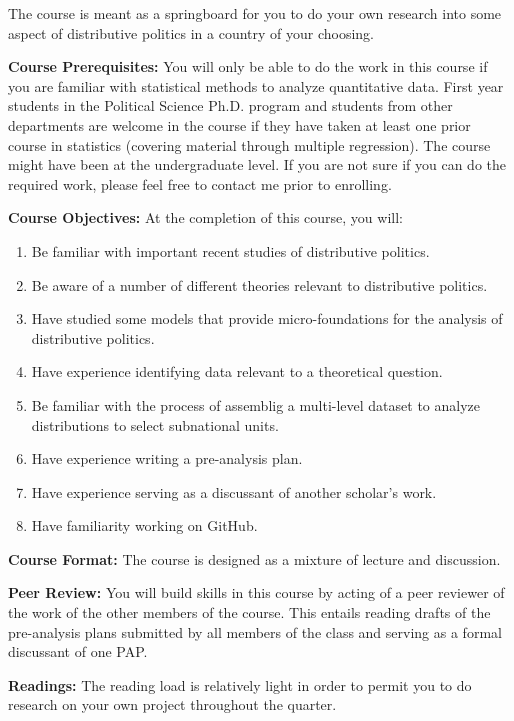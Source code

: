 \documentclass[11pt]{article}
\begin{document}
The course is meant as a springboard for you to do your own research into some aspect of distributive politics in a country
of your choosing. 


\textbf {\large Course Prerequisites:}  You will only be able to do the work in this course if you are familiar with 
statistical methods to analyze quantitative data. First year students in the Political Science Ph.D. 
program and students from other departments are welcome in the course if they have taken at least 
one prior course in statistics (covering material through multiple regression). The 
course might have been at the undergraduate level. If you are not sure if you can do the 
required work, please feel free to contact me prior to enrolling.


\textbf {\large Course Objectives:}  At the completion of this course, you will:
\begin{enumerate} [noitemsep]
  \item  Be familiar with important recent studies of distributive politics.
\item Be aware of a number of different theories relevant to distributive politics.
\item Have studied some models that provide micro-foundations for the analysis of distributive politics.
\item Have experience identifying data relevant to a theoretical question.
\item Be familiar with the process of assemblig a multi-level dataset to analyze distributions to select subnational units.
\item Have experience writing a pre-analysis plan. 
\item Have experience serving as a discussant of another scholar's work.
\item Have familiarity working on GitHub.
\end{enumerate}

\textbf{\large Course Format:} The course is designed as a mixture of lecture and discussion. 

\textbf{\large Peer Review:} You will build skills in this course by acting of a peer reviewer of the work of the
other members of the course. This entails reading drafts of the pre-analysis plans submitted by all members of the
class and serving as a formal discussant of one PAP.

\textbf {\large Readings:} The reading load is relatively light in order to permit you to do 
 research on your own project throughout the quarter.
\end{document}
